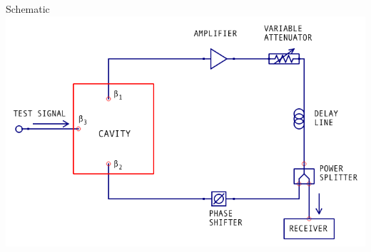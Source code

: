 \documentclass{beamer}
\begin{document}
\begin{frame}{Schematic}
\includegraphics[width=\textwidth]{no_isolator}
\end{frame}



%
%
%
\end{document}
